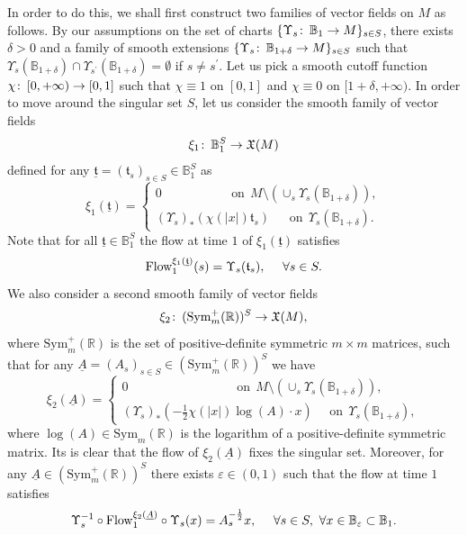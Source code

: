 \documentclass{article}
\numberwithin{equation}{section}        %
\theoremstyle{bfnote}
\theoremstyle{definition}
\theoremstyle{bfremark}
\newcommand{\col}{\colon \thinspace}        %
\newcommand{\R}{\mathbb{R}}                 %
\newcommand{\Ball}{\mathbb{B}}              %
\begin{document}
In order to do this, we shall first construct two families of vector fields on $M$ as follows. By our assumptions on the set of charts $\{\Upsilon_s \col \Ball_1 \to M\}_{s \in S}$, there exists $\delta > 0$ and a family of smooth extensions $\{\Upsilon_s \col \Ball_{1+\delta} \to M\}_{s \in S}$ such that $\Upsilon_s(\Ball_{1+\delta}) \cap \Upsilon_{s^\prime}(\Ball_{1+\delta}) = \emptyset$ if $s \neq s^\prime$. Let us pick a smooth cutoff function $\chi \col [0,+\infty) \to [0,1]$ such that $\chi \equiv 1$ on $[0,1]$ and $\chi \equiv 0$ on $[1+\delta,+\infty)$. In order to move around the singular set $S$, let us consider the smooth family of vector fields
\begin{align*}
        \xi_1 \col \Ball_1^S \to \mathfrak{X}(M)
\end{align*}
defined for any $\underline{\mathfrak{t}} = (\mathfrak{t}_s)_{s \in S} \in \Ball_1^S$ as
\begin{equation}
    \xi_1(\underline{\mathfrak{t}}) = \begin{cases} 0 ~~~~~~~~~~~~~~~~~~~~~~~~~\text{on} ~~ M \setminus (\cup_s \Upsilon_s(\Ball_{1+\delta})), \\
    (\Upsilon_s)_*(\chi(|x|) \mathfrak{t}_s) ~~~~~~~ \text{on} ~~ \Upsilon_s(\Ball_{1+\delta}) .
    \end{cases}
\end{equation}
Note that for all $\underline{\mathfrak{t}} \in \Ball_1^S$ the flow at time $1$ of $\xi_1(\underline{\mathfrak{t}})$ satisfies 
\begin{equation*}
    \textup{Flow}^{\xi_1(\underline{\mathfrak{t}})}_1(s) = \Upsilon_s(\mathfrak{t}_s), ~~~~ \forall s \in S.
\end{equation*}
We also consider a second smooth family of vector fields
\begin{align*}
    \xi_2 \col (\mathrm{Sym}^+_m(\R))^S \to \mathfrak{X}(M) ,
\end{align*}
where $\mathrm{Sym}^+_m(\R)$ is the set of positive-definite symmetric $m \times m$ matrices, such that for any $\underline{A} = (A_s)_{s \in S} \in (\mathrm{Sym}^+_m(\R))^S$ we have
\begin{equation}
    \xi_2(\underline{A}) = \begin{cases} 0 ~~~~~~~~~~~~~~~~~~~~~~~~~~~~~~~~~~~~~~~ \text{on} ~~ M \setminus (\cup_s \Upsilon_s(\Ball_{1+\delta})), \\
    (\Upsilon_s)_*(- \tfrac{1}{2} \chi(|x|) \log(A) \cdot x) ~~~~~~ \text{on} ~~ \Upsilon_s(\Ball_{1+\delta}),
    \end{cases}
\end{equation}
where $\log(A) \in \mathrm{Sym}_m(\R)$ is the logarithm of a positive-definite symmetric matrix. Its is clear that the flow of $\xi_2(\underline{A})$ fixes the singular set. Moreover, for any $\underline{A} \in (\mathrm{Sym}^+_m(\R))^S$ there exists $\varepsilon \in (0,1)$ such that the flow at time $1$ satisfies
\begin{equation*}
    \Upsilon_s^{-1} \circ \textup{Flow}^{\xi_2(\underline{A})}_1 \circ \Upsilon_s(x) = A_s^{-\frac{1}{2}} x, ~~~~ \forall s \in S, ~ \forall x \in \Ball_\varepsilon \subset \Ball_1.
\end{equation*}
\end{document}
